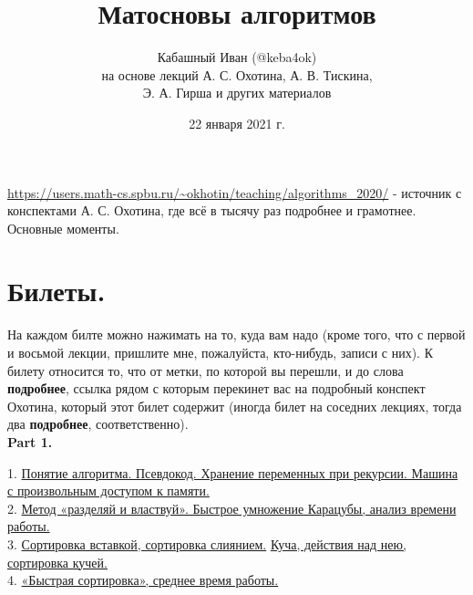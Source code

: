 \documentclass[a4paper]{article}
\title{Матосновы алгоритмов}
\author{Кабашный Иван (@keba4ok) \\ 
    на основе лекций А. С. Охотина, А. В. Тискина, \\ 
    Э. А. Гирша и других материалов}
\date{22 января 2021 г.}
\theoremstyle{indented}
\theoremstyle{definition}
\theoremstyle{remark}
\begin{document}
\newcommand{\resetexlcounters}{%
  \setcounter{exl}{0}%
} 

\newcommand{\resetremarkcounters}{%
  \setcounter{remark}{0}%
} 

\newcommand{\reseconscounters}{%
  \setcounter{cons}{0}%
} 

\newcommand{\resetall}{%
    \resetexlcounters
    \resetremarkcounters
    \reseconscounters%
}



\maketitle 

\newpage

\url{https://users.math-cs.spbu.ru/~okhotin/teaching/algorithms_2020/} - источник с конспектами А. С. Охотина, где всё в тысячу раз подробнее и грамотнее. \\

\hypertarget{t1}{Основные моменты}. 
\tableofcontents

\newpage

\section{Билеты.}

На каждом билте можно нажимать на то, куда вам надо (кроме того, что с первой и восьмой лекции, пришлите мне, пожалуйста, кто-нибудь, записи с них). К билету относится то, что от метки, по которой вы перешли, и до слова \textbf{подробнее}, ссылка рядом с которым перекинет вас на подробный конспект Охотина, который этот билет содержит (иногда билет на соседних лекциях, тогда два \textbf{подробнее}, соответственно). \\

\textbf{Part 1.} \ 

1. \hyperlink{d-1}{Понятие алгоритма. Псевдокод. Хранение переменных при рекурсии. Машина с произвольным доступом к памяти.} \\

2. \hyperlink{t-1}{Метод «разделяй и властвуй». Быстрое умножение Карацубы, анализ времени работы.} \\ 

3. \hyperlink{t-3}{Сортировка вставкой, сортировка слиянием.} \hyperlink{d1.5}{Куча, действия над нею, сортировка кучей.} \\ 

4. \hyperlink{r1}{«Быстрая сортировка», среднее время работы.} \\ 
\end{document}

